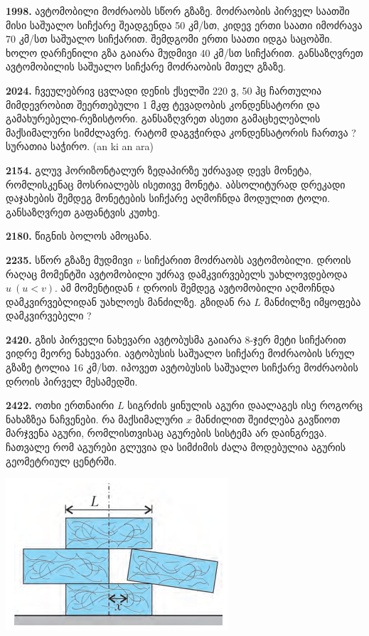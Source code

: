 \documentclass[12pt,a4paper,]{report}
\begin{document}
\textbf{1998.} ავტომობილი მოძრაობს სწორ გზაზე. მოძრაობის პირველ საათში მისი საშუალო სიჩქარე შეადგენდა 50 კმ/სთ, კიდევ ერთი საათი იმოძრავა 70 კმ/სთ საშუალო სიჩქარით. შემდგომი ერთი საათი იდგა საცობში. ხოლო დარჩენილი გზა გაიარა მუდმივი 40 კმ/სთ სიჩქარით. განსაზღვრეთ ავტომობილის საშუალო სიჩქარე მოძრაობის მთელ გზაზე.

\textbf{2024.} ჩვეულებრივ ცვლადი დენის ქსელში 220 ვ, 50 ჰც ჩართულია მიმდევრობით შეერთებული 1 მკფ ტევადობის კონდენსატორი და გამახურებელი-რეზისტორი. განსაზღვრეთ  ასეთი გამაცხელებლის მაქსიმალური სიმძლავრე. რატომ დაგვჭირდა კონდენსატორის ჩართვა ? 
სურათია საჭირო. (an ki an ara)

\textbf{2154.} გლუვ ჰორიზონტალურ ზედაპირზე უძრავად დევს მონეტა, რომლისკენაც მოსრიალებს ისეთივე მონეტა. აბსოლიტურად დრეკადი დაჯახების შემდეგ მონეტების სიჩქარე აღმოჩნდა მოდულით ტოლი. განსაზღვრეთ გაფანტვის კუთხე.

\textbf{2180.} წიგნის ბოლოს ამოცანა.

\textbf{2235.} სწორ გზაზე მუდმივი $v$ სიჩქარით მოძრაობს ავტომობილი. დროის რაღაც მომენტში ავტომობილი უძრავ დამკვირვებელს უახლოვდებოდა $u\ (u<v)$. ამ მომენტიდან $t$ დროის შემდეგ ავტომობილი აღმოჩნდა დამკვირვებლიდან უახლოეს მანძილზე. გზიდან რა $L$ მანძილზე იმყოფება დამკვირვებელი ? 

\textbf{2420.} გზის პირველი ნახევარი ავტობუსმა გაიარა 8-ჯერ მეტი სიჩქარით ვიდრე მეორე ნახევარი. ავტობუსის საშუალო სიჩქარე მოძრაობის სრულ გზაზე ტოლია 16 კმ/სთ. იპოვეთ ავტობუსის საშუალო სიჩქარე მოძრაობის დროის პირველ მესამედში.

\textbf{2422.} ოთხი ერთნაირი $L$ სიგრძის ყინულის აგური დაალაგეს ისე როგორც ნახაზზეა ნაჩვენები. რა მაქსიმალური $x$ მანძილით შეიძლება გავწიოთ მარჯვენა აგური, რომლისთვისაც აგურების სისტემა არ დაინგრევა. ჩათვალე რომ აგურები გლუვია და სიმძიმის ძალა მოდებულია აგურის გეომეტრიულ ცენტრში.
		\begin{center}
			\includegraphics[scale=0.6]{images/F2422.png}
		\end{center}
\end{document}
